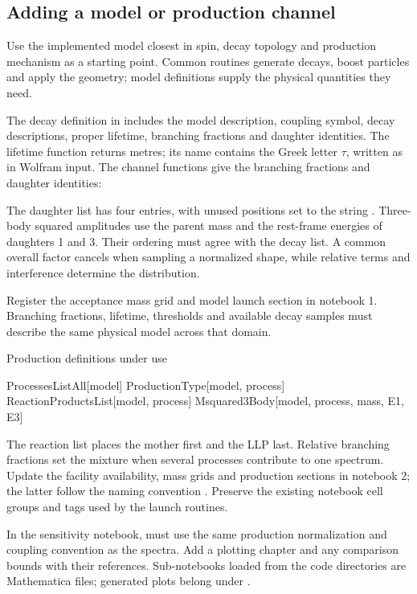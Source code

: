 \subsection{Adding a model or production channel}
Use the implemented model closest in spin, decay topology and production mechanism as a starting point. Common routines generate decays, boost particles and apply the geometry; model definitions supply the physical quantities they need.

The decay definition in  includes the model description, coupling symbol, decay descriptions, proper lifetime, branching fractions and daughter identities. The lifetime function returns metres; its name contains the Greek letter $\tau$, written as \code{\[Tau]} in Wolfram input. The channel functions give the branching fractions and daughter identities:
\begin{Code}
c\[Tau]LLP[model, description, mass, coupling]
ListBrRatios[model, mass, process, description]
ListDecayProducts[model, process]
\end{Code}
The daughter list has four entries, with unused positions set to the string . Three-body squared amplitudes use the parent mass and the rest-frame energies of daughters 1 and 3. Their ordering must agree with the decay list. A common overall factor cancels when sampling a normalized shape, while relative terms and interference determine the distribution.

Register the acceptance mass grid and model launch section in notebook 1. Branching fractions, lifetime, thresholds and available decay samples must describe the same physical model across that domain.

Production definitions under  use
\begin{Code}
ProcessesListAll[model]
ProductionType[model, process]
ReactionProductsList[model, process]
Msquared3Body[model, process, mass, E1, E3]
\end{Code}
The reaction list places the mother first and the LLP last. Relative branching fractions set the mixture when several processes contribute to one spectrum. Update the facility availability, mass grids and production sections in notebook 2; the latter follow the naming convention . Preserve the existing notebook cell groups and tags used by the launch routines.

In the sensitivity notebook,  must use the same production normalization and coupling convention as the spectra. Add a plotting chapter and any comparison bounds with their references. Sub-notebooks loaded from the code directories are Mathematica  files; generated plots belong under .

